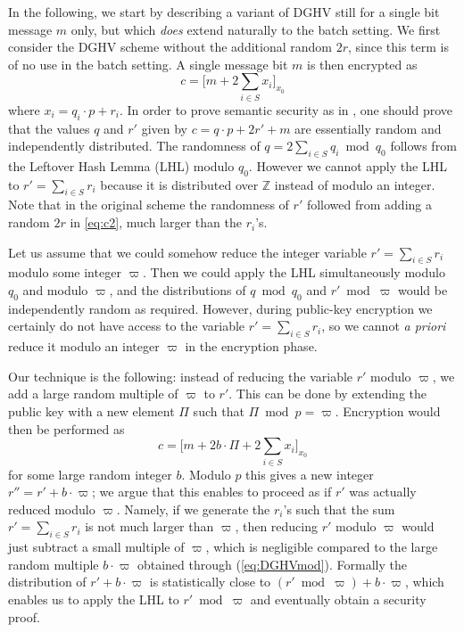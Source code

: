 \documentclass{llncs}
\begin{document}
In the following, we start by describing a variant of DGHV still for a
single bit message $m$ only, but which \emph{does} extend naturally to the
batch setting. We first consider the DGHV scheme without the additional
random $2r$, since this term is of no use in the batch setting. A single
message bit $m$ is then encrypted as
\[
    c = \Big[m + 2\sum\limits_{i\in S} x_i\Big]_{x_0}
\]
where $x_i=q_i \cdot p+r_i$. In order to prove semantic security as in
\cite{vDGHV2010}, one should prove that the values $q$ and $r'$ given by
$c=q \cdot p+2r'+m$ are essentially random and independently distributed.
The randomness of $q=2\sum_{i \in S} q_i \bmod q_0$ follows from the
Leftover Hash Lemma (LHL) modulo $q_0$. However we cannot apply the LHL
to $r'=\sum_{i \in S} r_i$ because it is distributed over ${\mathbb Z}$
instead of modulo an integer. Note that in the original scheme the
randomness of $r'$ followed from adding a random $2r$ in \eqref{eq:c2},
much larger than the $r_i$'s.

Let us assume that we could somehow reduce the integer variable
$r'=\sum_{i \in S} r_i$ modulo some integer $\varpi$. Then we could apply
the LHL simultaneously modulo $q_0$ and modulo $\varpi$, and the
distributions of $q \bmod q_0$ and $r' \bmod \varpi$ would be
independently random as required. However, during public-key encryption
we certainly do not have access to the variable $r'=\sum_{i \in S} r_i$,
so we cannot \emph{a priori} reduce it modulo an integer $\varpi$ in the
encryption phase.

Our technique is the following: instead of reducing the variable $r'$
modulo $\varpi$, we add a large random multiple of $\varpi$ to $r'$. This
can be done by extending the public key with a new element $\varPi$ such
that $\varPi \bmod p=\varpi$. Encryption would then be performed as
\begin{equation}
\label{eq:DGHVmod}
c = \Big[m + 2b \cdot \varPi+
  2\sum\limits_{i\in S} x_i\Big]_{x_0}
\end{equation}
for some large random integer $b$. Modulo $p$ this gives a new integer
$r''=r' + b \cdot \varpi$; we argue that this enables to proceed as if
$r'$ was actually reduced modulo $\varpi$. Namely, if we generate the
$r_i$'s such that the sum $r'=\sum_{i \in S} r_i$ is not much larger than
$\varpi$, then reducing $r'$ modulo $\varpi$ would just subtract a
small multiple of $\varpi$, which is negligible compared to the large
random multiple $b \cdot \varpi$ obtained through
(\ref{eq:DGHVmod}). Formally  the distribution of $r' + b 
\cdot \varpi$ is statistically close to $(r' \bmod \varpi) + b \cdot
\varpi$, which enables us to apply the LHL to $r' \bmod \varpi$ and
eventually obtain a security proof.
\end{document}
